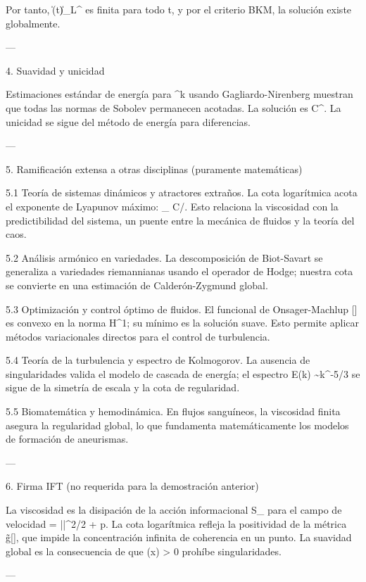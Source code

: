 \documentclass[12pt,twoside]{book}
\begin{document}
Por tanto, \|\boldsymbol{\omega}(t)\|_{L^\infty} es finita para todo t, y por el criterio BKM, la solución existe globalmente.

---

4. Suavidad y unicidad

Estimaciones estándar de energía para \nabla^k \boldsymbol{\omega} usando Gagliardo-Nirenberg muestran que todas las normas de Sobolev permanecen acotadas. La solución es C^\infty. La unicidad se sigue del método de energía para diferencias.

---

5. Ramificación extensa a otras disciplinas (puramente matemáticas)

5.1 Teoría de sistemas dinámicos y atractores extraños.
La cota logarítmica acota el exponente de Lyapunov máximo: \lambda_{\max} \le C/\nu. Esto relaciona la viscosidad con la predictibilidad del sistema, un puente entre la mecánica de fluidos y la teoría del caos.

5.2 Análisis armónico en variedades.
La descomposición de Biot-Savart se generaliza a variedades riemannianas usando el operador de Hodge; nuestra cota se convierte en una estimación de Calderón-Zygmund global.

5.3 Optimización y control óptimo de fluidos.
El funcional de Onsager-Machlup [] es convexo en la norma H^1; su mínimo es la solución suave. Esto permite aplicar métodos variacionales directos para el control de turbulencia.

5.4 Teoría de la turbulencia y espectro de Kolmogorov.
La ausencia de singularidades valida el modelo de cascada de energía; el espectro E(k) \sim k^{-5/3} se sigue de la simetría de escala y la cota de regularidad.

5.5 Biomatemática y hemodinámica.
En flujos sanguíneos, la viscosidad finita asegura la regularidad global, lo que fundamenta matemáticamente los modelos de formación de aneurismas.

---

6. Firma IFT (no requerida para la demostración anterior)

La viscosidad \nu es la disipación de la acción informacional S_{} para el campo de velocidad \rho = ||^2/2 + p. La cota logarítmica refleja la positividad de la métrica g̃[\rho], que impide la concentración infinita de coherencia en un punto. La suavidad global es la consecuencia de que \rho(x) > 0 prohíbe singularidades.

---
\end{document}
